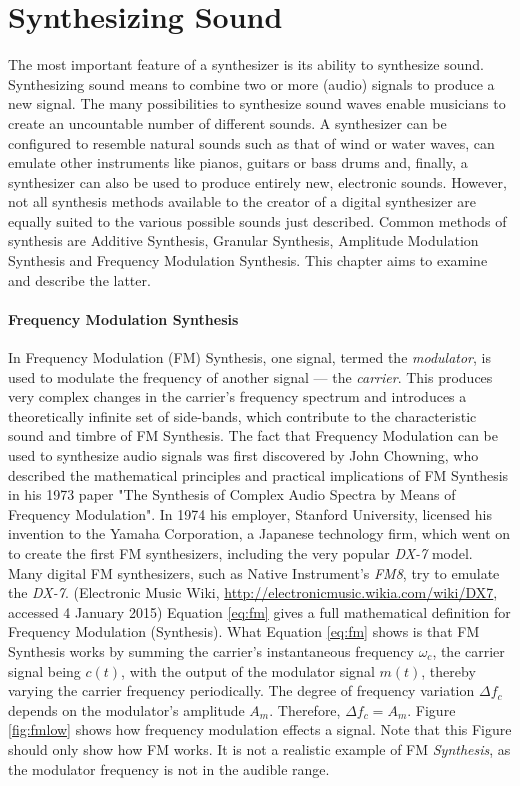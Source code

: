 \chapter{Synthesizing Sound}

The most important feature of a synthesizer is its ability to synthesize sound. Synthesizing sound means to combine two or more (audio) signals to produce a new signal. The many possibilities to synthesize sound waves enable musicians to create an uncountable number of different sounds. A synthesizer can be configured to resemble natural sounds such as that of wind or water waves, can emulate other instruments like pianos, guitars or bass drums and, finally, a synthesizer can also be used to produce entirely new, electronic sounds. However, not all synthesis methods available to the creator of a digital synthesizer are equally suited to the various possible sounds just described. Common methods of synthesis are Additive Synthesis, Granular Synthesis, Amplitude Modulation Synthesis and Frequency Modulation Synthesis. This chapter aims to examine and describe the latter.

\subsubsection{Frequency Modulation Synthesis}

In Frequency Modulation (FM) Synthesis, one signal, termed the \emph{modulator}, is used to modulate the frequency of another signal --- the \emph{carrier}. This produces very complex changes in the carrier's frequency spectrum and introduces a theoretically infinite set of side-bands, which contribute to the characteristic sound and timbre of FM Synthesis. The fact that Frequency Modulation can be used to synthesize audio signals was first discovered by John Chowning, who described the mathematical principles and practical implications of FM Synthesis in his 1973 paper "The Synthesis of Complex Audio Spectra by Means of Frequency Modulation". In 1974 his employer, Stanford University, licensed his invention to the Yamaha Corporation, a Japanese technology firm, which went on to create the first FM synthesizers, including the very popular \emph{DX-7} model. Many digital FM synthesizers, such as Native Instrument's \emph{FM8}, try to emulate the \emph{DX-7}. (Electronic Music Wiki, \url{http://electronicmusic.wikia.com/wiki/DX7}, accessed 4 January 2015) Equation \ref{eq:fm} gives a full mathematical definition for Frequency Modulation (Synthesis). What Equation \ref{eq:fm} shows is that FM Synthesis works by summing the carrier's instantaneous frequency $\omega_{c}$, the carrier signal being $c(t)$, with the output of the modulator signal $m(t)$, thereby varying the carrier frequency periodically. The degree of frequency variation $\Delta f_{c}$ depends on the modulator's amplitude $A_{m}$. Therefore, $\Delta f_{c} = A_{m}$. Figure \ref{fig:fmlow} shows how frequency modulation effects a signal. Note that this Figure should only show how FM works. It is not a realistic example of FM \emph{Synthesis}, as the modulator frequency is not in the audible range.

